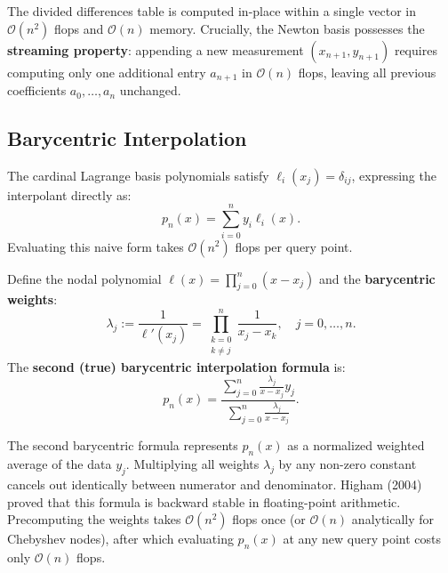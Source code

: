 The divided differences table is computed in-place within a single vector in $\mathcal{O}(n^2)$ flops and $\mathcal{O}(n)$ memory. Crucially, the Newton basis possesses the \textbf{streaming property}: appending a new measurement $(x_{n+1}, y_{n+1})$ requires computing only one additional entry $a_{n+1}$ in $\mathcal{O}(n)$ flops, leaving all previous coefficients $a_0, \dots, a_n$ unchanged.

\subsection{Barycentric Interpolation}

The cardinal Lagrange basis polynomials satisfy $\ell_i(x_j) = \delta_{ij}$, expressing the interpolant directly as:
\begin{equation}
    p_n(x) = \sum_{i=0}^{n} y_i \ell_i(x).
\end{equation}
Evaluating this naive form takes $\mathcal{O}(n^2)$ flops per query point.

\begin{theorem}
    Define the nodal polynomial $\ell(x) = \prod_{j=0}^{n} (x - x_j)$ and the \textbf{barycentric weights}:
    \begin{equation}
        \lambda_j := \frac{1}{\ell'(x_j)} = \prod_{\substack{k=0 \\ k \neq j}}^{n} \frac{1}{x_j - x_k}, \quad j = 0, \dots, n.
    \end{equation}
    The \textbf{second (true) barycentric interpolation formula} is:
    \begin{equation}
        p_n(x) = \frac{\sum_{j=0}^{n} \frac{\lambda_j}{x - x_j} y_j}{\sum_{j=0}^{n} \frac{\lambda_j}{x - x_j}}.
    \end{equation}
\end{theorem}

The second barycentric formula represents $p_n(x)$ as a normalized weighted average of the data $y_j$. Multiplying all weights $\lambda_j$ by any non-zero constant cancels out identically between numerator and denominator. Higham (2004) proved that this formula is backward stable in floating-point arithmetic. Precomputing the weights takes $\mathcal{O}(n^2)$ flops once (or $\mathcal{O}(n)$ analytically for Chebyshev nodes), after which evaluating $p_n(x)$ at any new query point costs only $\mathcal{O}(n)$ flops.

